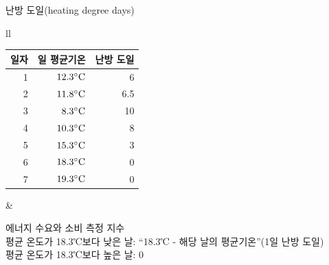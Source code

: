 \begin{frame}[t]{난방 도일(heating degree days)}
	\begin{tabular}{ll}
		\begin{minipage}[t]{0.50\textwidth}
			{\scriptsize
			\begin{table}[]
					\begin{tabular}{r|r|r}
						\hline
						일자 & 일 평균기온  & 난방 도일 \\						\hline
						1  & $12.3 \rm{{^\circ}C}$ & 6    \\						\hline
						2  & $11.8 \rm{{^\circ}C}$ & 6.5  \\						\hline
						3  & $8.3 \rm{{^\circ}C}$  & 10   \\						\hline
						4  & $10.3 \rm{{^\circ}C}$ & 8    \\						\hline
						5  & $15.3 \rm{{^\circ}C}$ & 3    \\						\hline
						6  & $18.3 \rm{{^\circ}C}$ & 0    \\						\hline
						7  & $19.3 \rm{{^\circ}C}$ & 0   \\					\hline
					\end{tabular}%
			\end{table}
		}
		\end{minipage}	
		&
		\begin{minipage}[t]{0.45\textwidth}
			에너지 수요와 소비 측정 지수\\
			평균 온도가 18.3℃보다 낮은 날: “18.3℃ - 해당 날의 평균기온”(1일 난방 도일)\\
			평균 온도가 18.3℃보다 높은 날: 0
		\end{minipage}
	\end{tabular}
\end{frame}




